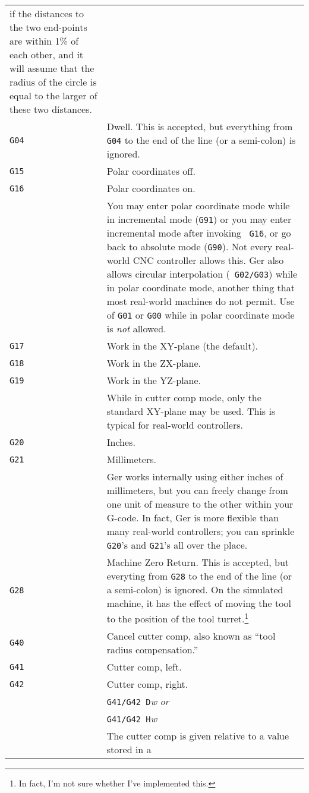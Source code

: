 \documentclass[titlepage,oneside,10pt]{article}
\begin{document}
\begin{longtable}{lp{10cm}}
if the distances to the two end-points are within 1\% of each other,
and it will assume that the radius of the circle is equal to the
larger of these two distances.\\
{\tt G04}&Dwell. This is accepted, but everything from {\tt G04} to
the end of the line (or a semi-colon) is ignored.\\
{\tt G15}&Polar coordinates off.\\
{\tt G16}&Polar coordinates on. \\
&You may enter polar coordinate mode while in incremental mode
({\tt G91}) or you may enter incremental mode after invoking {\tt
  G16}, or go back to absolute mode ({\tt G90}). Not every real-world CNC
controller allows this. Ger also allows circular interpolation ({\tt
  G02/G03}) while in polar coordinate mode, another thing that most
real-world machines do not permit. Use of {\tt G01} or {\tt G00} while
in polar coordinate mode is \emph{not} allowed.\\ 
{\tt G17}& Work in the XY-plane (the default).\\
{\tt G18}& Work in the ZX-plane.\\
{\tt G19}& Work in the YZ-plane.\\
& While in cutter comp mode, only the standard XY-plane may be
used. This is typical for real-world controllers.\\
{\tt G20}&Inches.\\
{\tt G21}&Millimeters.\\
& Ger works internally using either inches of millimeters, but you can
freely change from one unit of measure to the other within your
G-code. In fact, Ger is more flexible than many real-world
controllers; you can sprinkle {\tt G20}'s and {\tt G21}'s all over the
place.\\  
{\tt G28}&Machine Zero Return. This is accepted, but everyting from
{\tt G28} to the end of the line (or a semi-colon) is ignored. On the
simulated machine, it has the effect of moving the tool to the
position of the tool turret.\footnote{In fact, I'm not sure whether
  I've implemented this.}\\
{\tt G40}&Cancel cutter comp, also known as ``tool radius compensation.''\\
{\tt G41}&Cutter comp, left.\\
{\tt G42}&Cutter comp, right. \\
&{\tt G41/G42 D}\emph{w} \emph{or}\\
&{\tt G41/G42 H}\emph{w} \\
& The cutter comp is given relative to a value stored in a

\end{longtable}
\end{document}
